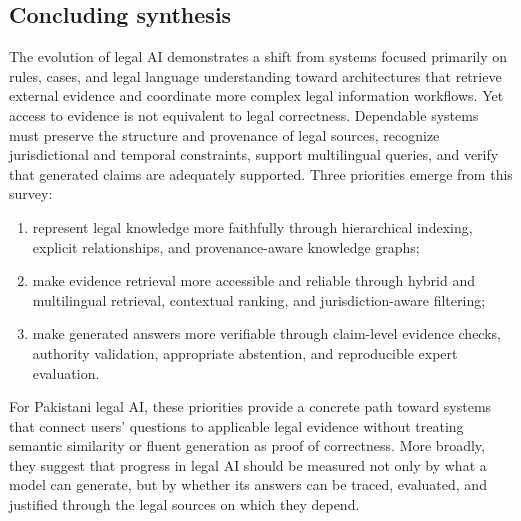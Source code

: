 \subsection{Concluding synthesis}

The evolution of legal AI demonstrates a shift from systems focused primarily on rules, cases, and legal
language understanding toward architectures that retrieve external evidence and coordinate more complex
legal information workflows. Yet access to evidence is not equivalent to legal correctness. Dependable
systems must preserve the structure and provenance of legal sources, recognize jurisdictional and temporal
constraints, support multilingual queries, and verify that generated claims are adequately supported.
Three priorities emerge from this survey:
\begin{enumerate}[leftmargin=1.4em, itemsep=2pt, topsep=2pt]
\item represent legal knowledge more faithfully through hierarchical indexing, explicit relationships, and
provenance-aware knowledge graphs;
\item make evidence retrieval more accessible and reliable through hybrid and multilingual retrieval,
contextual ranking, and jurisdiction-aware filtering;
\item make generated answers more verifiable through claim-level evidence checks, authority validation,
appropriate abstention, and reproducible expert evaluation.
\end{enumerate}

For Pakistani legal AI, these priorities provide a concrete path toward systems that connect users'
questions to applicable legal evidence without treating semantic similarity or fluent generation as proof
of correctness. More broadly, they suggest that progress in legal AI should be measured not only by what a
model can generate, but by whether its answers can be traced, evaluated, and justified through the legal
sources on which they depend.
